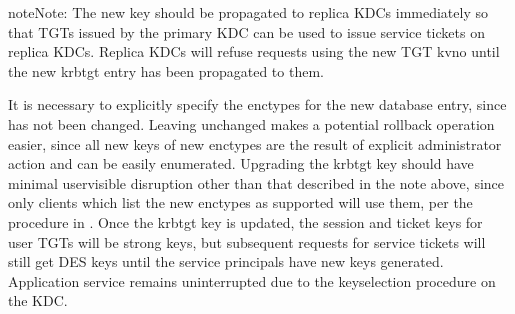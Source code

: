 \documentclass[letterpaper,10pt,english]{sphinxmanual}
\begin{document}
\begin{sphinxVerbatim}[commandchars=\\\{\}]
\PYG{p}{[} \PYG{p}{]}
 
\PYG{p}{[} \PYG{p}{]}
  
     
   
\end{sphinxVerbatim}

\begin{sphinxadmonition}{note}{Note:}
\sphinxAtStartPar
The new  key should be propagated to replica KDCs
immediately so that TGTs issued by the primary KDC can be used to
issue service tickets on replica KDCs.  Replica KDCs will refuse
requests using the new TGT kvno until the new krbtgt entry has
been propagated to them.
\end{sphinxadmonition}

\sphinxAtStartPar
It is necessary to explicitly specify the enctypes for the new database
entry, since  has not been changed.  Leaving
 unchanged makes a potential rollback operation
easier, since all new keys of new enctypes are the result of explicit
administrator action and can be easily enumerated.
Upgrading the krbtgt key should have minimal user\sphinxhyphen{}visible disruption other
than that described in the note above, since only clients which list the
new enctypes as supported will use them, per the procedure
in {\hyperref[\detokenize{admin/enctypes:session-key-selection}]{}}.
Once the krbtgt key is updated, the session and ticket keys for user
TGTs will be strong keys, but subsequent requests
for service tickets will still get DES keys until the service principals
have new keys generated.  Application service
remains uninterrupted due to the key\sphinxhyphen{}selection procedure on the KDC.
\end{document}
